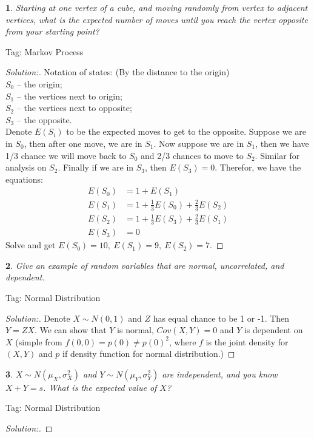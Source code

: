 \documentclass[10pt]{report}
\newtheorem{exe}{}[chapter]
\newenvironment{sol}{\begin{proof}[Solution:]}{\end{proof}}
\begin{document}
\begin{exe}
Starting at one vertex of a cube, and moving randomly from
vertex to adjacent vertices, what is the expected number of moves until you
reach the vertex opposite from your starting point?
\end{exe}
\begin{teacher}
Tag: Markov Process
\begin{sol}
Notation of states: (By the distance to the origin)\\
$S_0$ -- the origin;\\
$S_1$ -- the vertices next to origin;\\
$S_2$ -- the vertices next to opposite;\\
$S_3$ -- the opposite.\\
Denote $E(S_i)$ to be the expected moves to get to the opposite. Suppose we are in $S_0$, then after one move, we are in $S_1$. Now suppose we are in $S_1$, then we have 1/3 chance we will move back to $S_0$ and 2/3 chances to move to $S_2$. Similar for analysis on $S_2$. Finally if we are in $S_3$, then $E(S_3)=0$. Therefor, we have the equations:
\begin{align*}
E(S_0) &= 1+E(S_1)\\    
E(S_1) &= 1+\frac{1}{3}E(S_0)+\frac{2}{3}E(S_2)\\
E(S_2) &= 1+\frac{1}{3}E(S_3)+\frac{2}{3}E(S_1)\\
E(S_3) &= 0
\end{align*}
Solve and get $E(S_0)=10,\ E(S_1) =9,\ E(S_2) = 7$.
\end{sol}
\end{teacher}

\begin{exe}
Give an example of random variables that are normal, uncorrelated, and dependent.
\end{exe}
\begin{teacher}
Tag: Normal Distribution
\begin{sol}
Denote $X\sim N(0,1)$ and $Z$ has equal chance to be 1 or -1. Then $Y=ZX$. We can show that $Y$ is normal, $Cov(X, Y)=0$ and $Y$ is dependent on $X$ (simple from $f(0, 0) = p(0)\neq p(0)^2$, where $f$ is the joint density for $(X, Y)$ and $p$ if density function for normal distribution.)
\end{sol}
\end{teacher}

\begin{exe}
$X \sim N(\mu_X, \sigma_X^2)$ and $Y \sim N(\mu_Y, \sigma_Y^2)$ are independent, and you know $X + Y = s$. What is the expected value of $X$?
\end{exe}
\begin{teacher}
Tag: Normal Distribution
\begin{sol}
\end{sol}
\end{teacher}
\end{document}
